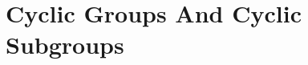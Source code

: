 \documentclass[9pt]{book}
\begin{document}
\begin{comment}
      \section{Homomorphisms And Isomorphisms}
         
      \section{Group Actions}
         
         
   \chapter{Subgroups}
      \section{Definition And Examples}
         
      \section{Centralizers And Normalizers, Stabilizes And Kernels}
         
      \section{Cyclic Groups And Cyclic Subgroups}
         
\end{comment}
      \section{Cyclic Groups And Cyclic Subgroups}
         
\end{document}
